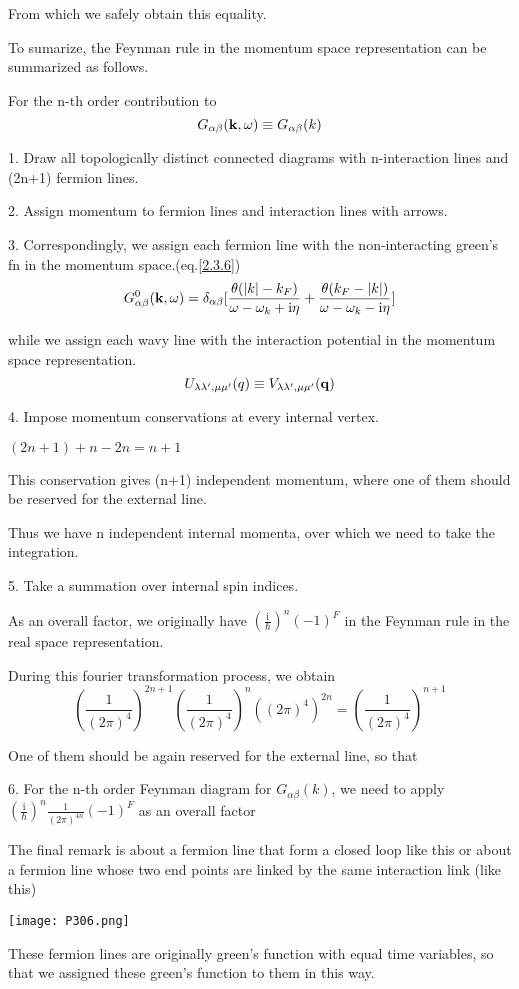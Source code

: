 From which  we safely obtain this equality.

To sumarize, the Feynman rule in the momentum space representation can be summarized as follows.

For the n-th order contribution to $$G_{\alpha\beta}({\bf k},\omega)\equiv G_{\alpha\beta}(k)$$

1. Draw all topologically distinct connected diagrams with n-interaction lines and (2n+1) fermion lines.

2. Assign momentum to fermion lines and interaction lines with arrows.

3. Correspondingly, we assign each fermion line with the non-interacting green's fn in the momentum space.(eq.\ref{2.3.6})
$$G_{\alpha\beta}^0({\bf k},\omega)=\delta_{\alpha\beta}[\frac{\theta(|k|-k_F)}{\omega-\omega_k+\mathrm{i}\eta}+\frac{\theta(k_F-|k|)}{\omega-\omega_k-\mathrm{i}\eta}]$$

while we assign each wavy line with the interaction potential in the momentum space representation.
$$U_{\lambda\lambda',\mu\mu'}(q)\equiv V_{\lambda\lambda',\mu\mu'}({\bf q})$$

4. Impose momentum conservations at every internal vertex.

$(2n+1)+n-2n=n+1$

This conservation gives (n+1) independent momentum, where one of them should be reserved for the external line.

Thus we have n independent internal momenta, over which we need to take the integration.

5. Take a summation over internal spin indices.

As an overall factor, we originally have $(\frac{\mathrm{i}}{\hbar})^n(-1)^F$ in the Feynman rule in the real space representation.

During this fourier transformation process, we obtain
$$(\frac{1}{(2\pi)^4})^{2n+1}(\frac{1}{(2\pi)^4})^n((2\pi)^4)^{2n}=(\frac{1}{(2\pi)^4})^{n+1}$$

One of them should be again reserved for the external line, so that

6. For the n-th order Feynman diagram for $G_{\alpha\beta}(k)$, we need to apply $(\frac{\mathrm{i}}{\hbar})^n\frac{1}{(2\pi)^{4n}}(-1)^F$ as an overall factor

The final remark  is about a fermion line that form a closed loop like this or about a fermion line whose two end points are linked by the same interaction link (like this)
\begin{center}
\texttt{[image: P306.png]}
\end{center}
These fermion lines are originally green's function with equal time variables, so that we assigned these green's function to them in this way.

